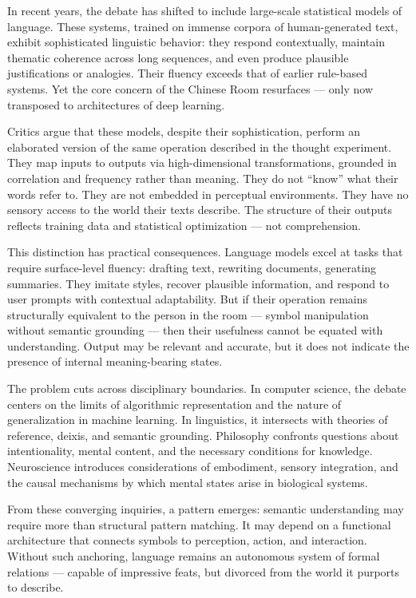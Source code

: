 In recent years, the debate has shifted to include large-scale statistical models of language. These systems, trained on immense corpora of human-generated text, exhibit sophisticated linguistic behavior: they respond contextually, maintain thematic coherence across long sequences, and even produce plausible justifications or analogies. Their fluency exceeds that of earlier rule-based systems. Yet the core concern of the Chinese Room resurfaces — only now transposed to architectures of deep learning.

Critics argue that these models, despite their sophistication, perform an elaborated version of the same operation described in the thought experiment. They map inputs to outputs via high-dimensional transformations, grounded in correlation and frequency rather than meaning. They do not “know” what their words refer to. They are not embedded in perceptual environments. They have no sensory access to the world their texts describe. The structure of their outputs reflects training data and statistical optimization — not comprehension.

This distinction has practical consequences. Language models excel at tasks that require surface-level fluency: drafting text, rewriting documents, generating summaries. They imitate styles, recover plausible information, and respond to user prompts with contextual adaptability. But if their operation remains structurally equivalent to the person in the room — symbol manipulation without semantic grounding — then their usefulness cannot be equated with understanding. Output may be relevant and accurate, but it does not indicate the presence of internal meaning-bearing states.

The problem cuts across disciplinary boundaries. In computer science, the debate centers on the limits of algorithmic representation and the nature of generalization in machine learning. In linguistics, it intersects with theories of reference, deixis, and semantic grounding. Philosophy confronts questions about intentionality, mental content, and the necessary conditions for knowledge. Neuroscience introduces considerations of embodiment, sensory integration, and the causal mechanisms by which mental states arise in biological systems.

From these converging inquiries, a pattern emerges: semantic understanding may require more than structural pattern matching. It may depend on a functional architecture that connects symbols to perception, action, and interaction. Without such anchoring, language remains an autonomous system of formal relations — capable of impressive feats, but divorced from the world it purports to describe.

